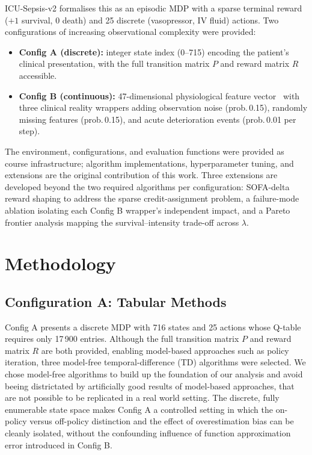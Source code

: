 \documentclass[11pt,a4paper]{article}
\begin{document}
ICU-Sepsis-v2 formalises this as an episodic MDP with a sparse terminal reward
($+1$ survival, $0$ death) and 25 discrete (vasopressor, IV fluid) actions.
Two configurations of increasing observational complexity were provided:

\begin{itemize}
  \item \textbf{Config A (discrete):} integer state index (0--715) encoding the
        patient's clinical presentation, with the full transition matrix $P$ and
        reward matrix $R$ accessible.
  \item \textbf{Config B (continuous):} 47-dimensional physiological feature
        vector~\cite{komorowski2018} with three clinical reality wrappers adding
        observation noise (prob.\,0.15), randomly missing features (prob.\,0.15),
        and acute deterioration events (prob.\,0.01 per step).
\end{itemize}

The environment, configurations, and evaluation functions were provided as
course infrastructure; algorithm implementations, hyperparameter tuning, and
extensions are the original contribution of this work. Three extensions are
developed beyond the two required algorithms per configuration: SOFA-delta
reward shaping to address the sparse credit-assignment problem, a failure-mode
ablation isolating each Config B wrapper's independent impact, and a Pareto
frontier analysis mapping the survival--intensity trade-off across $\lambda$.


\section{Methodology}
\label{sec:methodology}

\subsection{Configuration A: Tabular Methods}
\label{sec:method_a}

Config A presents a discrete MDP with 716 states and 25 actions whose Q-table
requires only 17\,900 entries. Although the full transition matrix $P$ and reward
matrix $R$ are both provided, enabling model-based approaches such as policy
iteration, three model-free temporal-difference (TD) algorithms were selected.
We chose model-free algorithms to build up the foundation of our analysis and avoid 
beeing districtated by artificially good results of model-based approaches, that are 
not possible to be replicated in a real world setting. 
The discrete, fully enumerable state space makes Config A a controlled setting
in which the on-policy versus off-policy distinction and the effect of
overestimation bias can be cleanly isolated, without the confounding influence
of function approximation error introduced in Config B.
\end{document}

